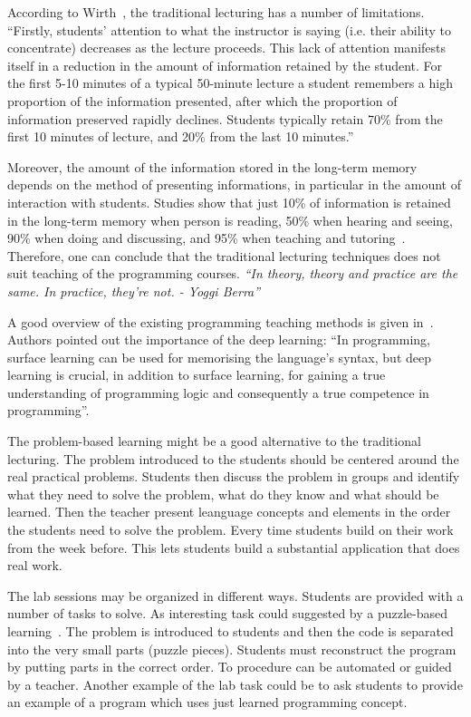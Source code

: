 \documentclass{article}
\begin{document}
According to Wirth~\cite{wirth}, the traditional lecturing has a number of
limitations.  ``Firstly, students' attention to what the instructor is saying
(i.e. their ability to concentrate) decreases as the lecture proceeds. This lack
of attention manifests itself in a reduction in the amount of information
retained by the student. For the first 5-10 minutes of a typical 50-minute
lecture a student remembers a high proportion of the information presented,
after which the proportion of information preserved rapidly declines. Students
typically retain 70\% from the first 10 minutes of lecture, and 20\% from the
last 10 minutes.''

Moreover, the amount of the information stored in the long-term memory depends
on the method of presenting informations, in particular in the amount of
interaction with students.  Studies show that just 10\% of information  is
retained in the long-term memory when person is reading, 50\% when hearing and
seeing, 90\% when doing and discussing, and 95\% when teaching and
tutoring~\cite{magnesen}. Therefore, one can conclude that the traditional
lecturing techniques does not suit teaching of the programming courses.
\emph{``In theory, theory and practice are the same. In practice,
they’re not. - Yoggi Berra'' }



A good overview of the existing programming teaching methods is given
in~\cite{mohorovivcic2011overview}. Authors pointed out the importance
of the deep learning: ``In programming, surface learning can be used
for memorising the language’s syntax, but deep learning is crucial, in
addition to surface learning, for gaining a true understanding of
programming logic and consequently a true competence in
programming''.

The problem-based learning might be a good alternative to the
traditional lecturing.  The problem introduced to the students should
be centered around the real practical problems. Students then discuss
the problem in groups and identify what they need to solve the
problem, what do they know and what should be learned. Then the
teacher present leanguage concepts and elements in the order the
students need to solve the problem. Every time students build
on their work from the week before. This lets students build a
substantial application that does real work.


The lab sessions may be organized in different ways. Students are
provided with a number of tasks to solve. As interesting task could
suggested by a puzzle-based
learning~\cite{mohorovivcic2011overview}. The problem is introduced to
students and then the code is separated into the very small parts
(puzzle pieces). Students must reconstruct the program by putting
parts in the correct order. To procedure can be automated or guided by
a teacher. Another example of the lab task could be to ask students to
provide an example of a program which uses just learned programming
concept.
\end{document}
